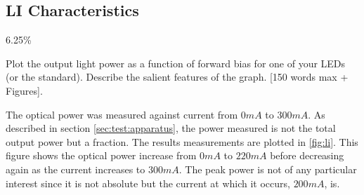 \subsection{LI Characteristics}
\label{sec:test:li}

6.25\%

Plot the output light power as a function of forward bias for one of your LEDs (or the standard). Describe the salient features of the graph. [150 words max + Figures].



The optical power was measured against current from $0mA$ to $300mA$. As described in section \ref{sec:test:apparatus}, the power measured is not the total output power but a fraction. The results measurements are plotted in \ref{fig:li}. This figure shows the optical power increase from $0mA$ to $220mA$ before decreasing again as the current increases to $300mA$. The peak power is not of any particular interest since it is not absolute but the current at which it occurs, $200mA$, is.
